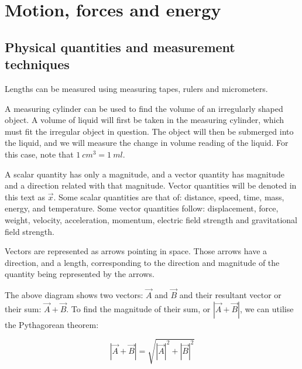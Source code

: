 \section{Motion, forces and energy}
\subsection{Physical quantities and measurement techniques}

Lengths can be measured using measuring tapes, rulers and micrometers.

A measuring cylinder can be used to find the volume of an irregularly shaped object. A volume
of liquid will first be taken in the measuring cylinder, which must fit the irregular object in
question. The object will then be submerged into the liquid, and we will measure the change in
volume reading of the liquid. For this case, note that $\SI{1}{cm^3} = \SI{1}{ml}$.

A scalar quantity has only a magnitude, and a vector quantity has magnitude and a direction related
with that magnitude. Vector quantities will be denoted in this text as $\vec{x}$. Some scalar
quantities are that of: distance, speed, time, mass, energy, and temperature. Some vector 
quantities follow: displacement, force, weight, velocity, acceleration, momentum, electric field
strength and gravitational field strength.

Vectors are represented as arrows pointing in space. Those arrows have a direction, and a length,
corresponding to the direction and magnitude of the quantity being represented by the arrows.

\begin{center}
\end{center}
The above diagram shows two vectors: $\vec{A}$ and $\vec{B}$ and their resultant vector or their 
sum: $\vec{A} + \vec{B}$. To find the magnitude of their sum, or $\left|\vec{A} + \vec{B}\right|$,
we can utilise the Pythagorean theorem:

$$\left|\vec{A} + \vec{B}\right| = \sqrt{ \left|\vec{A}\right|^2 + \left|\vec{B}\right|^2 }$$

